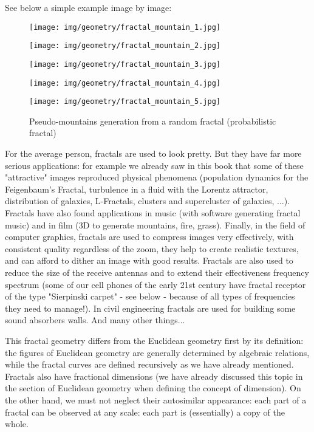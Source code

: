 	See below a simple example image by image:
	\begin{figure}[H]
		\centering
		\texttt{[image: img/geometry/fractal\_mountain\_1.jpg]}
	\end{figure}
	\begin{figure}[H]
		\centering
		\texttt{[image: img/geometry/fractal\_mountain\_2.jpg]}
	\end{figure}
	\begin{figure}[H]
		\centering
		\texttt{[image: img/geometry/fractal\_mountain\_3.jpg]}
	\end{figure}
	\begin{figure}[H]
		\centering
		\texttt{[image: img/geometry/fractal\_mountain\_4.jpg]}
	\end{figure}
	\begin{figure}[H]
		\centering
		\texttt{[image: img/geometry/fractal\_mountain\_5.jpg]}
		\caption{Pseudo-mountains generation from a random fractal (probabilistic fractal)}
	\end{figure}
	For the average person, fractals are used to look pretty. But they have far more serious applications: for example we already saw in this book that some of these "attractive" images reproduced physical phenomena (population dynamics for the Feigenbaum's Fractal, turbulence in a fluid with the Lorentz attractor, distribution of galaxies, L-Fractals, clusters and supercluster of galaxies, ...). Fractals have also found applications in music (with software generating fractal music) and in film (3D to generate mountains, fire, grass). Finally, in the field of computer graphics, fractals are used to compress images very effectively, with consistent quality regardless of the zoom, they help to create realistic textures, and can afford to dither an image with good results. Fractals are also used to reduce the size of the receive antennas and to extend their effectiveness frequency spectrum (some of our cell phones of the early 21st century have fractal receptor of the type "Sierpinski carpet" - see below - because of all types of frequencies they need to manage!). In civil engineering fractals are used for building some sound absorbers walls. And many other things...
	
	This fractal geometry differs from the Euclidean geometry first by its definition: the figures of Euclidean geometry are generally determined by algebraic relations, while the fractal curves are defined recursively as we have already mentioned. Fractals also have fractional dimensions (we have already discussed this topic in the section of Euclidean geometry when defining the concept of dimension). On the other hand, we must not neglect their autosimilar appearance: each part of a fractal can be observed at any scale: each part is (essentially) a copy of the whole.
	
